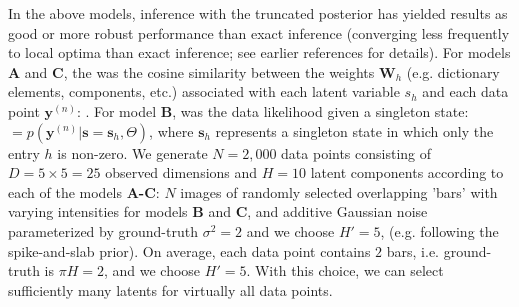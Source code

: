 \documentclass[12pt]{article}
\renewcommand{\vec}[1]{{\mathbf{#1}}}
\newcommand{\Kn}{\mathcal{K}_{n}}
\begin{document}
In the above models, inference with the truncated posterior  \rev{$\mathcal{S}_h(\vec{y}^{(n)})$}  \rev{$\Kn$} \rev{[of selected relevant variables} \rev{$\vec{s}(\vec{y}^{(n)})$}\rev{], shown in Equation~\eqref{eq:sel-func},} has yielded results as good or more robust performance than exact inference (converging less frequently to local optima than exact inference; see earlier references for details).
For models \textbf{A} and \textbf{C}, the  \rev{$\vec{f}(\vec{y}^{(n)})$} was the cosine similarity between the weights $\vec{W}_h$ (e.g. dictionary elements, components, etc.) associated with each latent variable $s_h$ and each data point $\vec{y}^{(n)}$: 
%
\rev{$\vec{f}(\vec{y}^{(n)})$} \rev{$ = (\vec{W}_{h}^{\mathrm{T}}\,/\,||\vec{W}_{h}||)\,\vec{y}^{(n)}$}.
For model \textbf{B},  was the data likelihood given a singleton state:
%
\rev{$\vec{f}(\vec{y}^{(n)})$} $= p(\vec{y}^{(n)} | \vec{s}=\vec{s}_h, \Theta)$, 
%
where $\vec{s}_h$ represents a singleton state in which only the entry $h$ is non-zero.
We generate $N=2,000$ data points consisting of $D=5\times5=25$ observed dimensions and $H=10$ latent components according to each of the models \textbf{A-C}:
$N$ images of randomly selected overlapping 'bars' with varying intensities for models \textbf{B} and \textbf{C}, and additive Gaussian noise parameterized by ground-truth $\sigma^2 = 2$ and we choose $H' = 5$, (e.g. following the spike-and-slab prior). 
On average, each data point contains $2$ bars, i.e. ground-truth is $\pi H = 2$, and we choose $H'=5$. With this choice,
we can select sufficiently many latents for virtually all data points.
\end{document}
